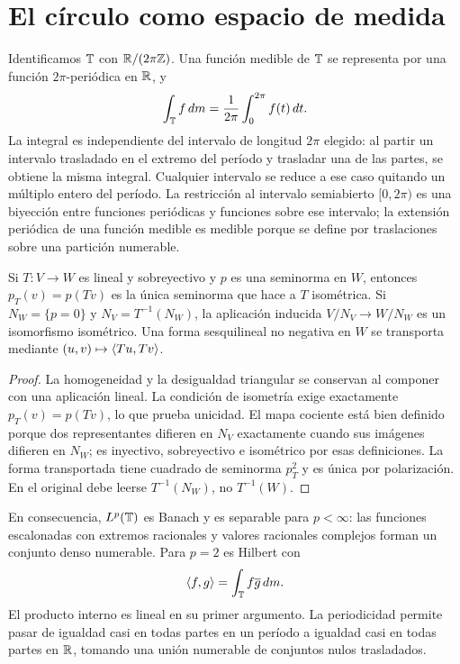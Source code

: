 \section{El círculo como espacio de medida}\label{lectura:v4-03}
Identificamos $\mathbb T$ con $\mathbb R/(2\pi\mathbb Z)$. Una función medible de $\mathbb T$ se representa por una función $2\pi$-periódica en $\mathbb R$, y
\[
 \int_\mathbb T f\,dm=\frac1{2\pi}\int_0^{2\pi}f(t)\,dt.
\]
La integral es independiente del intervalo de longitud $2\pi$ elegido: al partir un intervalo trasladado en el extremo del período y trasladar una de las partes, se obtiene la misma integral. Cualquier intervalo se reduce a ese caso quitando un múltiplo entero del período. La restricción al intervalo semiabierto $[0,2\pi)$ es una biyección entre funciones periódicas y funciones sobre ese intervalo; la extensión periódica de una función medible es medible porque se define por traslaciones sobre una partición numerable.
\begin{proposicion}
Si $T:V\to W$ es lineal y sobreyectivo y $p$ es una seminorma en $W$, entonces $p_T(v)=p(Tv)$ es la única seminorma que hace a $T$ isométrica. Si $N_W=\{p=0\}$ y $N_V=T^{-1}(N_W)$, la aplicación inducida $V/N_V\to W/N_W$ es un isomorfismo isométrico. Una forma sesquilineal no negativa en $W$ se transporta mediante $(u,v)\mapsto\left\langle Tu,Tv\right\rangle$.
\end{proposicion}
\begin{proof}
La homogeneidad y la desigualdad triangular se conservan al componer con una aplicación lineal. La condición de isometría exige exactamente $p_T(v)=p(Tv)$, lo que prueba unicidad. El mapa cociente está bien definido porque dos representantes difieren en $N_V$ exactamente cuando sus imágenes difieren en $N_W$; es inyectivo, sobreyectivo e isométrico por esas definiciones. La forma transportada tiene cuadrado de seminorma $p_T^2$ y es única por polarización. En el original debe leerse $T^{-1}(N_W)$, no $T^{-1}(W)$.
\end{proof}
En consecuencia, $L^p(\mathbb T)$ es Banach y es separable para $p<\infty$: las funciones escalonadas con extremos racionales y valores racionales complejos forman un conjunto denso numerable. Para $p=2$ es Hilbert con
\[
 \left\langle f,g\right\rangle=\int_\mathbb T f\overline g\,dm.
\]
El producto interno es lineal en su primer argumento. La periodicidad permite pasar de igualdad casi en todas partes en un período a igualdad casi en todas partes en $\mathbb R$, tomando una unión numerable de conjuntos nulos trasladados.

